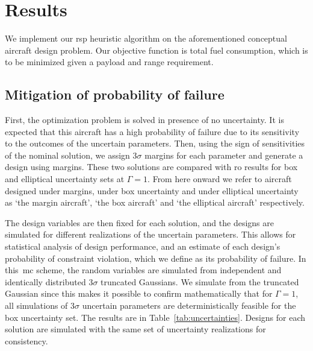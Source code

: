 \section{Results}

We implement our \gls{rsp} heuristic algorithm on the aforementioned conceptual aircraft design problem.
Our objective function is total fuel consumption, which is
to be minimized given a payload and range requirement.

\subsection{Mitigation of probability of failure}

First, the optimization problem is solved in presence of no uncertainty. It is expected
that this aircraft has a high probability of failure due to its sensitivity
to the outcomes of the uncertain parameters. Then, using the sign of
sensitivities of the nominal solution, we assign $3\sigma$ margins for each parameter
and generate a design using margins. These two solutions are compared with \gls{ro} results for
box and elliptical uncertainty sets at $\Gamma = 1$. From here onward we refer to
aircraft designed under margins, under box uncertainty and
under elliptical uncertainty as `the margin aircraft', `the box aircraft' and `the elliptical aircraft' respectively.

The design variables are then fixed for each solution, and the designs are simulated for
different realizations of the uncertain parameters.
This allows for statistical analysis of design performance, and
an estimate of each design's probability of constraint
violation, which we define as its probability of failure.
In this~\gls{mc} scheme, the random variables
are simulated from independent and identically distributed $3\sigma$ truncated Gaussians.
We simulate from the truncated Gaussian since this makes it possible to
confirm mathematically that for $\Gamma = 1$, all simulations of $3\sigma$ uncertain parameters are
deterministically feasible for the box uncertainty set. The results are in Table~\ref{tab:uncertainties}.
Designs for each solution
are simulated with the same set of uncertainty realizations for consistency.

